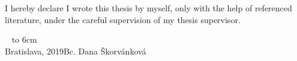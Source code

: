 \documentclass[12pt, a4paper, oneside]{book}
\newcommand\mfauthor{Bc. Dana Škorvánková}
\newcommand\mfplacedate{Bratislava, 2019}
\begin{document}
\thispagestyle{empty}


\begin{figure}[H]
\begin{center}
\label{img:zadanie}
\end{center}
\end{figure}

{~}\vspace{12cm}

\noindent
\begin{minipage}{0.25\textwidth}~\end{minipage}
\begin{minipage}{0.75\textwidth}
I hereby declare I wrote this thesis by myself, only with the help of
referenced literature, under the careful supervision of my thesis
supervisor.
\newline \newline
\end{minipage}
\vfill
~ \hfill {\hbox to 6cm{\dotfill}} \\
\mfplacedate \hfill \mfauthor
\vfill\eject 
\end{document}
